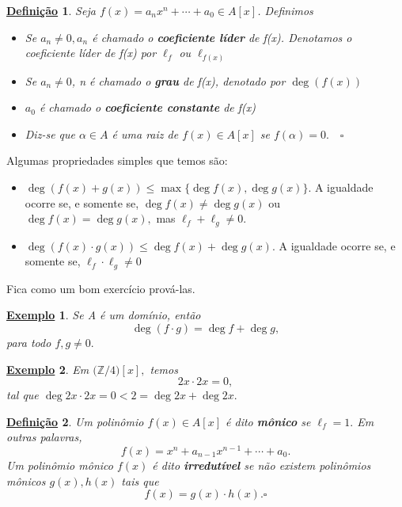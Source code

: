 \documentclass{article}
\newtheorem*{def*}{\underline{Defini\c c\~ao}}
\newtheorem{example}{\underline{Exemplo}}
\begin{document}
    \begin{def*}
      Seja \(f(x) = a_{n}x^{n} + \cdots + a_{0}\in A[x]\). Definimos
      \begin{itemize}
        \item[1)] Se \(a_{n}\neq0, a_{n}\) é chamado o \textbf{coeficiente líder} de f(x). Denotamos o coeficiente líder
          de f(x) por \(\ell_{f}\) ou \(\ell_{f(x)}\)
        \item[2)] Se \(a_{n}\neq0\), n é chamado o \textbf{grau} de f(x), denotado por \(\deg(f(x))\)
        \item[3)] \(a_{0}\) é chamado o \textbf{coeficiente constante} de f(x)
        \item[4)] Diz-se que \(\alpha\in A\) é uma raiz de \(f(x)\in A[x]\) se \(f(\alpha ) = 0.\quad\square\)
      \end{itemize}
    \end{def*}
    Algumas propriedades simples que temos são:
    \begin{itemize}
      \item[i)] \(\deg{(f(x) + g(x))}\leq \max\{\deg{f(x)}, \deg{g(x)}\}\). A igualdade ocorre se, e somente se,
        \(\deg{f(x)}\neq \deg{g(x)}\) ou \(\deg{f(x)}=\deg{g(x)},\) mas \(\ell_{f} + \ell_{g}\neq0.\)
      \item[2)] \(\deg{(f(x)\cdot g(x))}\leq \deg{f(x)} + \deg{g(x)}.\) A igualdade ocorre se, e somente se,
        \(\ell_{f}\cdot \ell_{g} \neq0\)
    \end{itemize}
    Fica como um bom exercício prová-las.
    \begin{example}
      Se A é um domínio, então 
      \[
        \deg{(f \cdot g)} = \deg{f} + \deg{g},
      \]
      para todo \(f, g\neq0.\)
    \end{example}
    \begin{example}
      Em \(\biggl(\mathbb{Z}/4\biggr)[x],\) temos 
      \[
        2x \cdot 2x = 0,
      \]
      tal que \(\deg{2x \cdot 2x} = 0 < 2 = \deg{2x} + \deg{2x}.\)
    \end{example}
    \begin{def*}
      Um polinômio \(f(x)\in A[x]\) é dito \textbf{mônico} se \(\ell_{f} = 1.\) Em outras palavras, 
      \[
        f(x) = x^{n} + a_{n-1}x^{n-1} + \cdots + a_{0}.
      \]
      Um polinômio mônico \(f(x)\) é dito \textbf{irredutível} se não existem polinômios mônicos
      \(g(x), h(x)\) tais que 
      \[
        f(x) = g(x)\cdot h(x).\square
      \]
    \end{def*}
\end{document}
